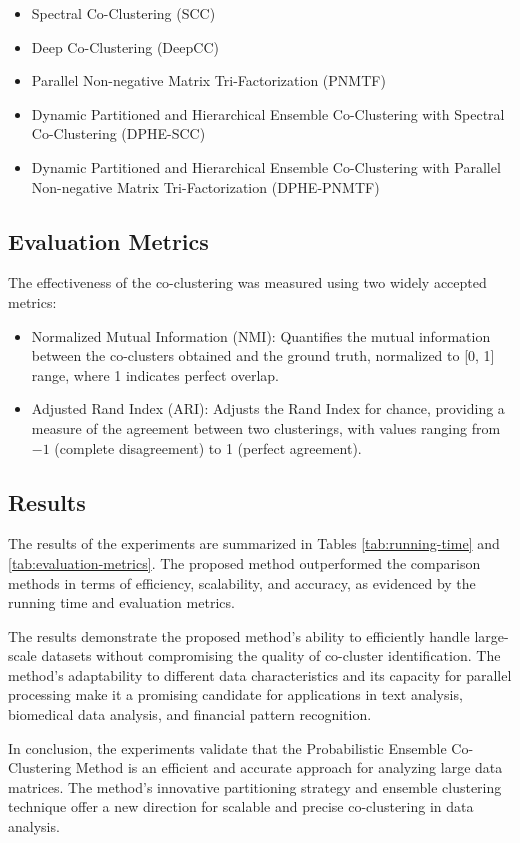 \begin{itemize}
    \item Spectral Co-Clustering (SCC)
    \item Deep Co-Clustering (DeepCC)
    \item Parallel Non-negative Matrix Tri-Factorization (PNMTF)
    \item Dynamic Partitioned and Hierarchical Ensemble Co-Clustering with Spectral Co-Clustering (DPHE-SCC)
    \item Dynamic Partitioned and Hierarchical Ensemble Co-Clustering with Parallel Non-negative Matrix Tri-Factorization (DPHE-PNMTF)
\end{itemize}

\subsection{Evaluation Metrics}
The effectiveness of the co-clustering was measured using two widely accepted metrics:

\begin{itemize}
    \item Normalized Mutual Information (NMI): Quantifies the mutual information between the co-clusters obtained and the ground truth, normalized to [0, 1] range, where 1 indicates perfect overlap.
    \item Adjusted Rand Index (ARI): Adjusts the Rand Index for chance, providing a measure of the agreement between two clusterings, with values ranging from $-1$ (complete disagreement) to 1 (perfect agreement).
\end{itemize}

\subsection{Results}
The results of the experiments are summarized in Tables \ref{tab:running-time} and \ref{tab:evaluation-metrics}. The proposed method outperformed the comparison methods in terms of efficiency, scalability, and accuracy, as evidenced by the running time and evaluation metrics.

The results demonstrate the proposed method's ability to efficiently handle large-scale datasets without compromising the quality of co-cluster identification. The method's adaptability to different data characteristics and its capacity for parallel processing make it a promising candidate for applications in text analysis, biomedical data analysis, and financial pattern recognition.

In conclusion, the experiments validate that the Probabilistic Ensemble Co-Clustering Method is an efficient and accurate approach for analyzing large data matrices. The method's innovative partitioning strategy and ensemble clustering technique offer a new direction for scalable and precise co-clustering in data analysis.
